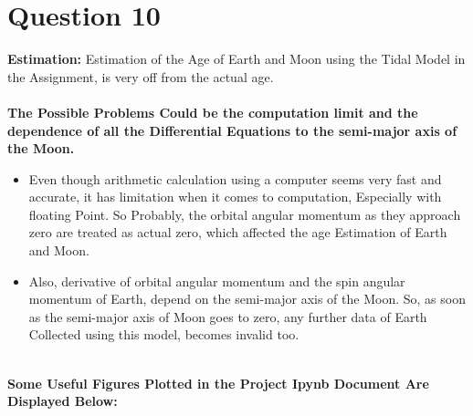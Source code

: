 \documentclass[12pt, letterpaper]{article}
\begin{document}
\section*{Question 10}

\textbf{Estimation: } Estimation of the Age of Earth and Moon using the Tidal Model in the Assignment, is very off from the actual age. \\ \\
\textbf{The Possible Problems Could be the computation limit and the dependence of all the Differential Equations to the semi-major axis of the Moon. } 
\begin{itemize}
    \item Even though arithmetic calculation using a computer seems very fast and accurate, it has limitation when it comes to computation, Especially with floating Point. So Probably, the orbital angular momentum as they approach zero are treated as actual zero, which affected the age Estimation of Earth and Moon.
    \item Also, derivative of orbital angular momentum and the spin angular momentum of Earth, depend on the semi-major axis of the Moon. So, as soon as the semi-major axis of Moon goes to zero, any further data of Earth Collected using this model, becomes invalid too.\\ \\
\end{itemize}
\newpage

\textbf{Some Useful Figures Plotted in the Project Ipynb Document Are Displayed Below:}
\end{document}
